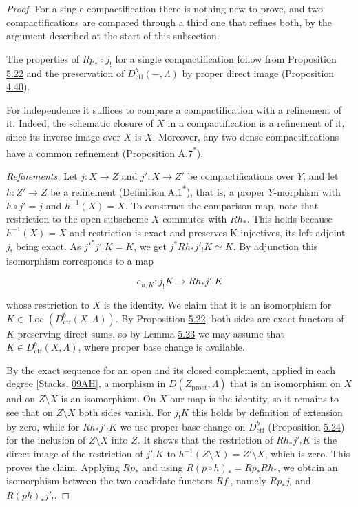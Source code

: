 \documentclass[11pt]{article}
\newcommand{\bpout}[1]{#1\textsuperscript{\hyperlink{bp-outside}{\ensuremath{\ast}}}}
\providecommand{\Loc}{}\renewcommand{\Loc}{\operatorname{Loc}}
\begin{document}
\begin{proof}[{Proof}]\label{bp493}%
For a single compactification there is nothing new to prove, and two compactifications are compared through a third one that refines both, by the argument described at the start of this subsection.

The properties of \(Rp_*\circ j_!\) for a single compactification follow from Proposition \hyperref[bp482]{5.22} and the preservation of \(D^b_{\mathrm{ctf}}(-,\Lambda)\) by proper direct image (Proposition \hyperref[bp405]{4.40}).

For independence it suffices to compare a compactification with a refinement of it. Indeed, the schematic closure of \(X\) in a compactification is a refinement of it, since its inverse image over \(X\) is \(X\). Moreover, any two dense compactifications have a common refinement (Proposition \bpout{A.7}).

\emph{Refinements.} Let \(j:X\to Z\) and \(j':X\to Z'\) be compactifications over \(Y\), and let \(h:Z'\to Z\) be a refinement (Definition \bpout{A.1}), that is, a proper \(Y\)-morphism with \(h\circ j'=j\) and \(h^{-1}(X)=X\). To construct the comparison map, note that restriction to the open subscheme \(X\) commutes with \(Rh_*\). This holds because \(h^{-1}(X)=X\) and restriction is exact and preserves K-injectives, its left adjoint \(j_!\) being exact. As \(j'^*j'_!K=K\), we get \(j^*Rh_*j'_!K\simeq K\). By adjunction this isomorphism corresponds to a map

\[
e_{h,K}:j_!K\longrightarrow Rh_*j'_!K
\tag{5.7}
\]

whose restriction to \(X\) is the identity. We claim that it is an isomorphism for \(K\in\Loc(D^b_{\mathrm{ctf}}(X,\Lambda))\). By Proposition \hyperref[bp482]{5.22}, both sides are exact functors of \(K\) preserving direct sums, so by Lemma \hyperref[bp485]{5.23} we may assume that \(K\in D^b_{\mathrm{ctf}}(X,\Lambda)\), where proper base change is available.

By the exact sequence for an open and its closed complement, applied in each degree [Stacks, \href{https://stacks.math.columbia.edu/tag/09AH}{09AH}], a morphism in \(D(Z_{\mathrm{pro}\acute{e}t},\Lambda)\) that is an isomorphism on \(X\) and on \(Z\setminus X\) is an isomorphism. On \(X\) our map is the identity, so it remains to see that on \(Z\setminus X\) both sides vanish. For \(j_!K\) this holds by definition of extension by zero, while for \(Rh_*j'_!K\) we use proper base change on \(D^b_{\mathrm{ctf}}\) (Proposition \hyperref[bp488]{5.24}) for the inclusion of \(Z\setminus X\) into \(Z\). It shows that the restriction of \(Rh_*j'_!K\) is the direct image of the restriction of \(j'_!K\) to \(h^{-1}(Z\setminus X)=Z'\setminus X\), which is zero. This proves the claim. Applying \(Rp_*\) and using \(R(p\circ h)_*=Rp_*Rh_*\), we obtain an isomorphism between the two candidate functors \(Rf_!\), namely \(Rp_*j_!\) and \(R(ph)_*j'_!\).


\end{proof}
\end{document}
